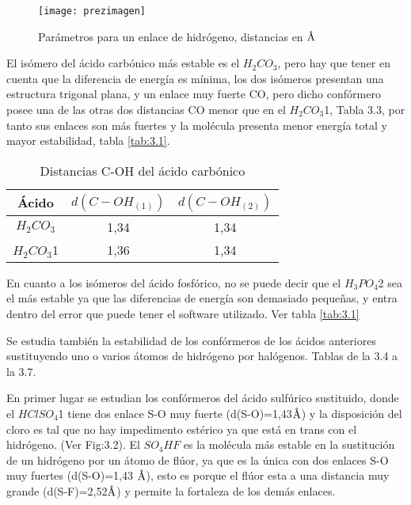 \begin{figure}[H]
	\centering
	\texttt{[image: prezimagen]}
	\caption{Parámetros para un enlace de hidrógeno, distancias en $\mbox{\normalfont\AA}$}
\end{figure}

El isómero del ácido carbónico más estable es el $H_2CO_3$, pero hay que tener en cuenta que la diferencia de energía es mínima, los dos isómeros presentan una estructura trigonal plana, y un enlace muy fuerte CO, pero dicho confórmero posee una de las otras dos distancias CO menor que en el $H_2CO_3$1, Tabla 3.3, por tanto sus enlaces son más fuertes y la molécula presenta menor energía total y mayor estabilidad, tabla \ref{tab:3.1}. 
\begin{table}[H]
    \centering
    \begin{tabular}{|c|c|c|}
    \hline
    Ácido & $d(C-OH_{(1)})$ & $d(C-OH_{(2)})$ \\ \hline
    $H_2CO_3$ & 1,34 & 1,34  \\ \hline
    $H_2CO_3$1 & 1,36 & 1,34 \\ \hline 
    \end{tabular}
    \caption{Distancias C-OH del ácido carbónico}
\end{table}

En cuanto a los isómeros del ácido fosfórico, no se puede decir que el $H_3PO_4$2 sea el más estable ya que las diferencias de energía son demasiado pequeñas, y entra dentro del error que puede tener el software utilizado. Ver tabla \ref{tab:3.1}

Se estudia también la estabilidad de los confórmeros de los ácidos anteriores sustituyendo uno o varios átomos de hidrógeno por halógenos. Tablas de la 3.4 a la 3.7.

En primer lugar se estudian los confórmeros del ácido sulfúrico sustituido, donde el $HClSO_4$1 tiene dos enlace S-O muy fuerte (d(S-O)=1,43$\mbox{\normalfont\AA}$) y la disposición del cloro es tal que no hay impedimento estérico ya que está en trans con el hidrógeno. (Ver Fig:3.2). El $SO_4HF$ es la molécula más estable en la sustitución de un hidrógeno por un átomo de flúor, ya que es la única con dos enlaces S-O muy fuertes (d(S-O)=1,43 $\mbox{\normalfont\AA}$), esto es porque el flúor esta a una distancia muy grande (d(S-F)=2,52$\mbox{\normalfont\AA}$) y permite la fortaleza de los demás enlaces.

